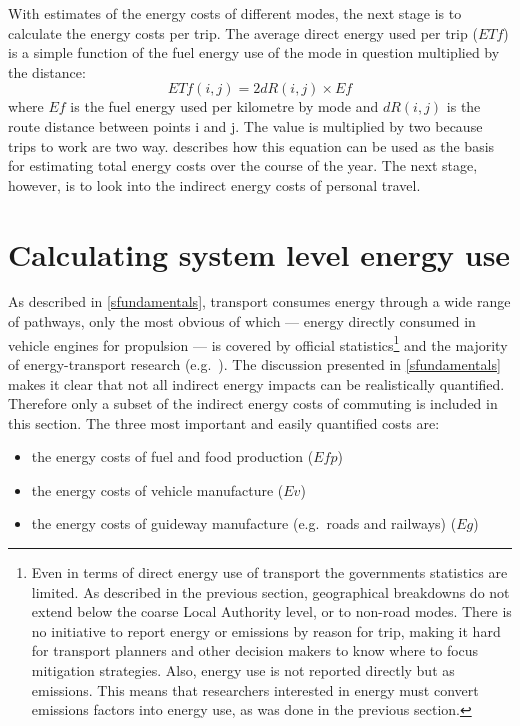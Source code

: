 With estimates of the energy costs of different modes, the next stage is to
calculate the energy costs per trip. The average
direct energy used per trip ($ETf$) is a simple function of the fuel
energy use of the mode in question multiplied by the distance:
\begin{equation}
 ETf(i,j) = 2 dR(i,j) \times Ef
\label{eq:et}
\end{equation}
where $Ef$ is the fuel energy used per kilometre by mode and $dR(i,j)$ is
the route distance between points i and j. The value is multiplied by two
because trips to work are two way.  %
describes how this equation can be used as the basis for estimating total
energy costs over the course of the year. The next stage, however, is to
look into the indirect energy costs of personal travel.

\section{Calculating system level energy use} \label{ssystemlevel}
As described in \cref{sfundamentals}, transport consumes energy through a
wide range of pathways, only the most obvious of which ---
energy directly consumed in vehicle engines for propulsion --- is covered by official
statistics\footnote{Even
in terms of direct energy use of transport the governments statistics are limited.
As described in the previous section, geographical breakdowns do not extend
below the coarse Local Authority level, or to non-road modes. There is no
initiative to report energy or emissions by reason for trip, making it hard
for transport planners and other decision makers to know where to focus
mitigation strategies. Also, energy use is not reported directly but as emissions.
This means that
researchers interested in energy must convert
emissions factors into energy use, as was done in the previous section.
}
and the majority of energy-transport
research (e.g.~\citealp{schipper1992energy, Wohlgemuth1998, Hickman1999, Brand2013}).
The discussion presented in \cref{sfundamentals} makes it clear that not all
indirect energy impacts can be realistically quantified. Therefore only a subset of
the indirect energy costs of commuting is included in this section. The three most
important and easily quantified costs are:
\begin{itemize}
 \item the energy costs of fuel and food production ($Efp$)
 \item the energy costs of vehicle manufacture ($Ev$)
 \item the energy costs of guideway manufacture (e.g.~roads and railways) ($Eg$)
\end{itemize} 

